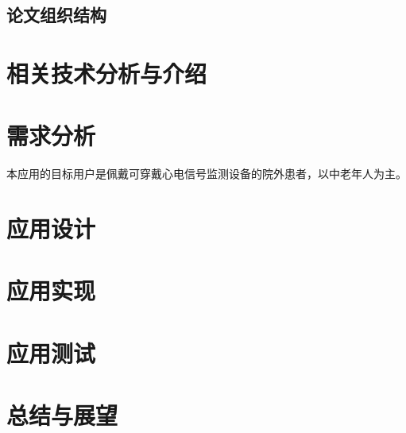 \documentclass{ecnuthesis}
\begin{document}
    \section{论文组织结构}\label{sec:structure}


    \chapter{相关技术分析与介绍}\label{ch:tech}


    \chapter{需求分析}\label{ch:requirement}

    本应用的目标用户是佩戴可穿戴心电信号监测设备的院外患者，以中老年人为主。


    \chapter{应用设计}\label{ch:design}


    \chapter{应用实现}\label{ch:implement}


    \chapter{应用测试}\label{ch:test}


    \chapter{总结与展望}\label{ch:conclusion}


    \backmatter
    \PrintReference

    \begin{appendix}
        \listoftodos
    \end{appendix}

    \begin{acknowledgement}
    \end{acknowledgement}
\end{document}
